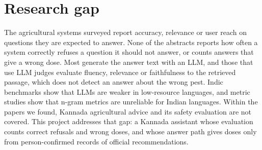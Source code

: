 \section{Research gap}
The agricultural systems surveyed report accuracy, relevance or user reach on questions they
are expected to answer. None of the abstracts reports how often a system correctly refuses a
question it should not answer, or counts answers that give a wrong dose. Most generate the
answer text with an LLM, and those that use LLM judges evaluate fluency, relevance or
faithfulness to the retrieved passage, which does not detect an answer about the wrong pest.
Indic benchmarks show that LLMs are weaker in low-resource languages, and metric studies show
that n-gram metrics are unreliable for Indian languages. Within the papers we found, Kannada
agricultural advice and its safety evaluation are not covered. This project addresses that
gap: a Kannada assistant whose evaluation counts correct refusals and wrong doses, and whose
answer path gives doses only from person-confirmed records of official recommendations.
